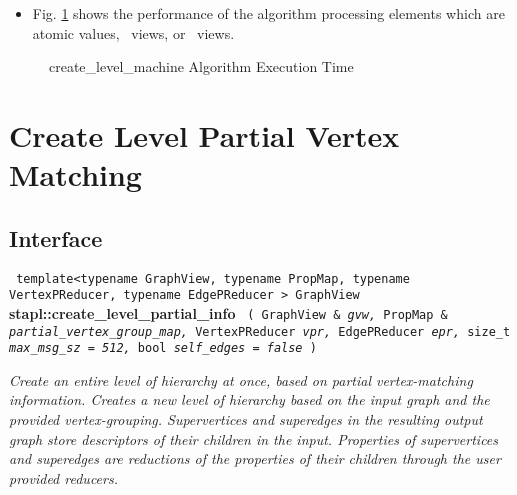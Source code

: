 \begin{itemize}
\item
Fig. \ref{fig:cr_level_mach-alg-exec-exper}
shows the performance of the algorithm processing
elements which are atomic values, \stl\ views, or \stapl\ views.
\end{itemize}

\begin{figure}[p]
\caption{ create\_level\_machine Algorithm Execution Time}
\label{fig:cr_level_mach-alg-exec-exper}
\end{figure}


\section{ Create Level Partial Vertex Matching}
\label{sec-create-level-part-alg}

\subsection{Interface} \label{sec-create-level-part-alg-inter}

\noindent
\texttt{%
template<typename GraphView, typename PropMap, 
\newline
typename VertexPReducer, typename EdgePReducer >
\newline
GraphView 
}
\newline
\textbf{stapl::create\_level\_partial\_info}%
\newline
\texttt{%
(
GraphView \&
\textit{gvw,}%
PropMap \&
\textit{partial\_vertex\_group\_map,}%
VertexPReducer
\textit{vpr,}%
EdgePReducer
\textit{epr,}%
size\_t
\textit{max\_msg\_sz = 512,}%
bool
\textit{self\_edges = false}%
)     
}
\vspace{0.4cm}

\textit{
Create an entire level of hierarchy at once, based on partial vertex-matching information.
Creates a new level of hierarchy based on the input graph and the provided vertex-grouping. 
Supervertices and superedges in the resulting output graph store descriptors of their children in the input. 
Properties of supervertices and superedges are reductions of the properties of their children through the user provided reducers.
}
\vspace{0.4cm}

